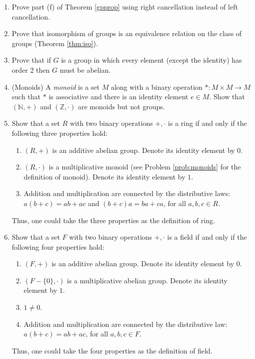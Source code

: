 \documentclass[11pt]{article}
\newenvironment{problems}
{
 \begin{enumerate}[topsep=1pt,itemsep=0pt,parsep=2pt,leftmargin=0.6cm,%
 label={\arabic*.}, ref=\arabic*] \small
}
{
 \end{enumerate}
}
\theoremstyle{definition}
\newcommand{\Z}{\mathbb{Z}} %
\newcommand{\N}{\mathbb{N}} %
\begin{document}
\begin{problems}
\item Prove part (f) of Theorem \ref{gpprop} using right
cancellation instead of left cancellation.


\item Prove that isomorphism of groups is an equivalence relation
on the class of groups (Theorem \ref{thm:iso}).


\item Prove that if $G$ is a group in which every element (except the
  identity) has order 2 then $G$ must be abelian.

\item \label{prob:monoids} (Monoids) A \emph{monoid} is a set $M$
  along with a binary operation $*: M \times M \to M$ such that $*$ is
  associative and there is an identity element $e \in M$. Show that
  $(\N, +)$ and $(\Z, \cdot)$ are monoids but not groups.


  

\item Show that a set $R$ with two binary operations $+, \cdot$ is a
  ring if and only if the following three properties hold:
  \begin{enumerate}
  \item $(R,+)$ is an additive abelian group. Denote its identity
    element by $0$.
  \item $(R, \cdot)$ is a multiplicative monoid (see Problem
    \ref{prob:monoids} for the definition of monoid). Denote its
    identity element by $1$.
  \item Addition and multiplication are connected by the distributive
    laws: $a(b+c) = ab+ac$ and $(b+c)a = ba+ca$, for all $a,b,c \in
    R$.
  \end{enumerate}
  Thus, one could take the three properties as the definition of ring.



\item Show that a set $F$ with two binary operations $+, \cdot$ is a
  field if and only if the following four properties hold:
  \begin{enumerate}
  \item $(F,+)$ is an additive abelian group. Denote its identity
    element by $0$.
  \item $(F-\{0\}, \cdot)$ is a multiplicative abelian group. Denote
    its identity element by $1$.
  \item $1 \ne 0$.
  \item Addition and multiplication are connected by the distributive
    law: $a(b+c) = ab+ac$, for all $a,b,c \in F$.
  \end{enumerate}
  Thus, one could take the four properties as the definition of field.

\end{problems}
\end{document}
